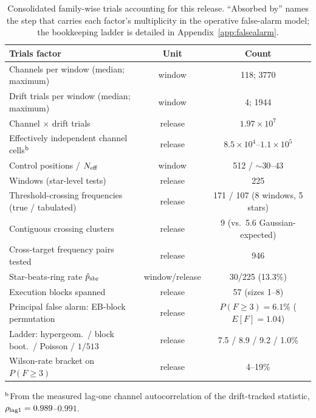 \documentclass{openjournal}
\begin{document}
\begin{table}
\centering
\small
\setlength{\tabcolsep}{4pt}
\caption{Consolidated family-wise trials accounting for this release.
``Absorbed by'' names the step that carries each factor's
multiplicity in the operative false-alarm model; the bookkeeping
ladder is detailed in Appendix~\ref{app:falsealarm}.}
\label{tab:trials}
\begin{tabular}{@{}lcc@{}}
\hline
Trials factor & Unit & Count \\
\hline
Channels per window (median; maximum) & window & 118; 3770 \\
Drift trials per window (median; maximum) & window & 4; 1944 \\
Channel $\times$ drift trials & release & $1.97\times10^{7}$ \\
Effectively independent channel cells$^{\rm b}$ & release & $8.5\times10^{4}$--$1.1\times10^{5}$ \\
Control positions / $N_{\rm eff}$ & window & 512 / ${\sim}30$--$43$ \\
Windows (star-level tests) & release & 225 \\
Threshold-crossing frequencies (true / tabulated) & release & 171 / 107 (8 windows, 5 stars) \\
Contiguous crossing clusters & release & 9 (vs.\ 5.6 Gaussian-expected) \\
Cross-target frequency pairs tested & release & 946 \\
Star-beats-ring rate $\hat{p}_{\rm sbr}$ & window/release & 30/225 (13.3\%) \\
Execution blocks spanned & release & 57 (sizes 1--8) \\
\quad Principal false alarm: EB-block permutation & release & $P(F{\geq}3)=6.1$\% ($E[F]{=}1.04$) \\
\quad Ladder: hypergeom.\ / block boot.\ / Poisson / $1/513$ & release & 7.5 / 8.9 / 9.2 / 1.0\% \\
\quad Wilson-rate bracket on $P(F{\geq}3)$ & release & 4--19\% \\
\hline
\end{tabular}
\parbox{\columnwidth}{\footnotesize $^{\rm b}$From the measured
lag-one channel autocorrelation of the drift-tracked statistic,
$\rho_{\rm lag1}=0.989$--$0.991$.}
\end{table}
\end{document}
